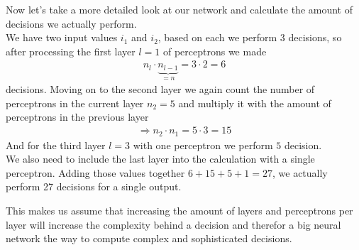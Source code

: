 \documentclass[10pt]{book}
\begin{document}
    Now let's take a more detailed look at our network and calculate the amount of decisions we actually perform.\\
    We have two input values \(i_1\) and \(i_2\), based on each we perform 3 decisions, so after processing the first layer \(l=1\) of perceptrons we made
    \begin{align}
        n_l\cdot \underbrace{n_{l-1}}_{=n} = 3\cdot 2 = 6
    \end{align}
    decisions. Moving on to the second layer we again count the number of perceptrons in the current layer \(n_2 = 5\) and
    multiply it with the amount of perceptrons in the previous layer
    \begin{align}
        \Rightarrow n_2 \cdot n_1 = 5 \cdot 3 = 15
    \end{align}
    And for the third layer \(l=3\) with one perceptron we perform \(5\) decision.\\
    We also need to include the last layer into the calculation with a single perceptron.
    Adding those values together \(6+15+5+1 = 27\), we actually perform 27 decisions for a single output.

    This makes us assume that increasing the amount of layers and perceptrons per layer will increase the complexity
    behind a decision and therefor a big neural network the way to compute complex and sophisticated decisions.
\end{document}
